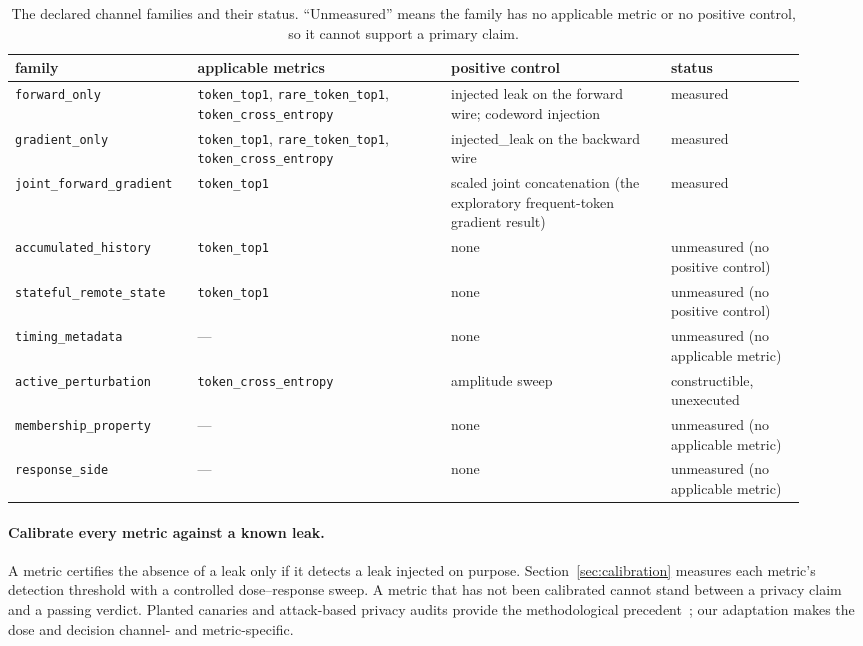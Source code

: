 \documentclass[11pt]{article}
\begin{document}
\begin{table}[H]
\centering\scriptsize
\begin{tabular}{@{}p{0.20\linewidth}p{0.30\linewidth}p{0.26\linewidth}p{0.16\linewidth}@{}}
\toprule
family & applicable metrics & positive control & status \\
\midrule
\texttt{forward\_only} & \texttt{token\_top1}, \texttt{rare\_token\_top1}, \texttt{token\_cross\_entropy} & injected leak on the forward wire; codeword injection & measured \\
\texttt{gradient\_only} & \texttt{token\_top1}, \texttt{rare\_token\_top1}, \texttt{token\_cross\_entropy} & injected\_leak on the backward wire & measured \\
\texttt{joint\_forward\_gradient} & \texttt{token\_top1} & scaled joint concatenation (the exploratory frequent-token gradient result) & measured \\
\texttt{accumulated\_history} & \texttt{token\_top1} & none & unmeasured (no positive control) \\
\texttt{stateful\_remote\_state} & \texttt{token\_top1} & none & unmeasured (no positive control) \\
\texttt{timing\_metadata} & --- & none & unmeasured (no applicable metric) \\
\texttt{active\_perturbation} & \texttt{token\_cross\_entropy} & amplitude sweep & constructible, unexecuted \\
\texttt{membership\_property} & --- & none & unmeasured (no applicable metric) \\
\texttt{response\_side} & --- & none & unmeasured (no applicable metric) \\
\bottomrule
\end{tabular}


\caption{The declared channel families and their status. ``Unmeasured'' means the family has no applicable metric or no positive
control, so it cannot support a primary claim.}
\label{tab:channels}
\end{table}

\paragraph{Calibrate every metric against a known leak.}
A metric certifies the absence of a leak only if it detects a leak injected on
purpose. Section~\ref{sec:calibration} measures each metric's detection threshold with a controlled
dose--response sweep. A metric that has not been calibrated cannot stand between
a privacy claim and a passing verdict. Planted canaries and attack-based privacy
audits provide the methodological precedent~\cite{carlini2019secret,jagielski2020auditing,nasr2023tight,steinke2023onerun,pillutla2023randomization};
our adaptation makes the dose and decision channel- and metric-specific.
\end{document}
